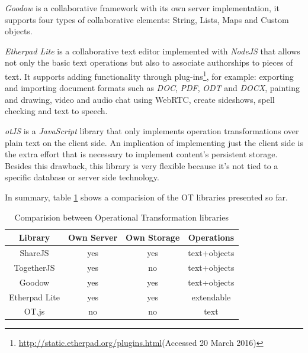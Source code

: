 	\emph{Goodow} is a collaborative framework with its own server implementation, it supports four types of collaborative elements: String, Lists, Maps and Custom objects.
	

	\emph{Etherpad Lite} is a collaborative text editor implemented with \emph{NodeJS} that allows not only the basic text operations but also to associate authorships to pieces of text. It supports adding functionality through plug-ins\footnote{\url{http://static.etherpad.org/plugins.html}(Accessed 20 March 2016)}, for example: exporting and importing document formats such as \emph{DOC}, \emph{PDF}, \emph{ODT} and \emph{DOCX}, painting and drawing, video and audio chat using WebRTC, create sideshows, spell checking and text to speech.
	


	\emph{otJS} is a \emph{JavaScript} library that only implements operation transformations over plain text on the client side. An implication of implementing just the client side is the extra effort that is necessary to implement content's persistent storage. Besides this drawback, this library is very flexible because it's not tied to a specific database or server side technology.
	

	In summary, table \ref{table:otcomparision} shows a comparision of the \ac{OT} libraries presented so far.

\begin{table}[!htb]
\centering
\caption{Comparision between Operational Transformation libraries}
\label{table:otcomparision}
\begin{tabular}{|c|c|c|c|}
\hline
\textbf{Library} & \textbf{Own Server} & \textbf{Own Storage} & \textbf{Operations} \\ \hline
ShareJS          & yes                 & yes                  & text+objects        \\ \hline
TogetherJS       & yes                 & no                   & text+objects        \\ \hline
Goodow           & yes                 & yes                  & text+objects        \\ \hline
Etherpad Lite    & yes                 & yes                  & extendable 			    \\ \hline
OT.js            & no                  & no                   & text                \\ \hline
\end{tabular}
\end{table}


